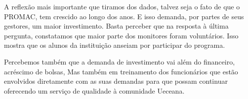 \documentclass[12pt,a4paper]{article}
\begin{document}
    	A reflexão mais importante que tiramos dos dados, talvez seja o fato de que o PROMAC, tem crescido ao longo dos 				anos. E isso demanda, por partes de seus gestores, um maior investimento. Basta perceber que na resposta à última 				pergunta, constatamos que maior parte dos monitores foram voluntários. Isso mostra que os alunos da instituição 				anseiam por participar do programa. 
    	
    	Percebemos também que a demanda de investimento vai além do financeiro, acréscimo de bolsas, Mas também em 						treinamento dos funcionários que estão envolvidos diretamente com as suas demandas para que possam continuar 					oferecendo um serviço de qualidade à comunidade Ueceana.
    	
    	

%
%
\end{document}
